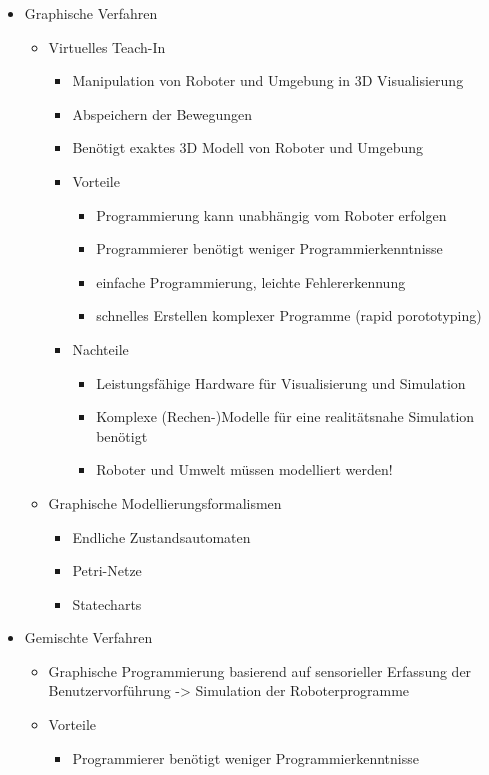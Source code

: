 \documentclass[paper=a4, fontsize=11pt]{scrartcl} %
\numberwithin{equation}{section} %
\numberwithin{figure}{section} %
\numberwithin{table}{section} %
\begin{document}
\begin{enumerate}
\begin{itemize}
\begin{itemize}
\begin{itemize}
\end{itemize}
\end{itemize}
\item Graphische Verfahren
\begin{itemize}
\item Virtuelles Teach-In
\begin{itemize}
\item Manipulation von Roboter und Umgebung in 3D Visualisierung
\item Abspeichern der Bewegungen
\item Benötigt exaktes 3D Modell von Roboter und Umgebung
\item Vorteile
\begin{itemize}
\item Programmierung kann unabhängig vom Roboter erfolgen
\item Programmierer benötigt weniger Programmierkenntnisse
\item einfache Programmierung, leichte Fehlererkennung
\item schnelles Erstellen komplexer Programme (rapid porototyping)
\end{itemize}
\item Nachteile
\begin{itemize}
\item Leistungsfähige Hardware für Visualisierung und Simulation
\item Komplexe (Rechen-)Modelle für eine realitätsnahe Simulation benötigt
\item Roboter und Umwelt müssen modelliert werden!
\end{itemize}
\end{itemize}
\item Graphische Modellierungsformalismen
\begin{itemize}
\item Endliche Zustandsautomaten
\item Petri-Netze
\item Statecharts
\end{itemize}
\end{itemize}
\item Gemischte Verfahren
\begin{itemize}
\item Graphische Programmierung basierend auf sensorieller Erfassung der Benutzervorführung -> Simulation der Roboterprogramme
\item Vorteile
\begin{itemize}
\item Programmierer benötigt weniger Programmierkenntnisse

\end{itemize}
\end{itemize}
\end{itemize}
\end{enumerate}
\end{document}
